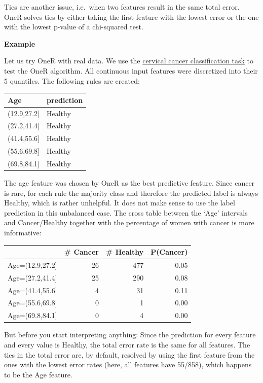 \documentclass[
  11pt,
]{scrbook}
\begin{document}
Ties are another issue, i.e.~when two features result in the same total error.
OneR solves ties by either taking the first feature with the lowest error or the one with the lowest p-value of a chi-squared test.

\textbf{Example}

Let us try OneR with real data.
We use the \protect\hyperlink{cervical}{cervical cancer classification task} to test the OneR algorithm.
All continuous input features were discretized into their 5 quantiles.
The following rules are created:

\begin{table}
\centering
\begin{tabular}{ll}
\toprule
Age & prediction\\
\midrule
(12.9,27.2] & Healthy\\
(27.2,41.4] & Healthy\\
(41.4,55.6] & Healthy\\
(55.6,69.8] & Healthy\\
(69.8,84.1] & Healthy\\
\bottomrule
\end{tabular}
\end{table}

The age feature was chosen by OneR as the best predictive feature.
Since cancer is rare, for each rule the majority class and therefore the predicted label is always Healthy, which is rather unhelpful.
It does not make sense to use the label prediction in this unbalanced case.
The cross table between the `Age' intervals and Cancer/Healthy together with the percentage of women with cancer is more informative:

\begin{table}
\centering
\begin{tabular}{lrrr}
\toprule
  & \# Cancer & \# Healthy & P(Cancer)\\
\midrule
Age=(12.9,27.2] & 26 & 477 & 0.05\\
Age=(27.2,41.4] & 25 & 290 & 0.08\\
Age=(41.4,55.6] & 4 & 31 & 0.11\\
Age=(55.6,69.8] & 0 & 1 & 0.00\\
Age=(69.8,84.1] & 0 & 4 & 0.00\\
\bottomrule
\end{tabular}
\end{table}

But before you start interpreting anything:
Since the prediction for every feature and every value is Healthy, the total error rate is the same for all features.
The ties in the total error are, by default, resolved by using the first feature from the ones with the lowest error rates (here, all features have 55/858), which happens to be the Age feature.
\end{document}
